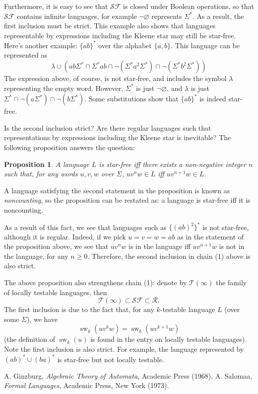 \documentclass[12pt]{article}
\newtheorem{prop}{Proposition}
\begin{document}
Furthermore, it is easy to see that $\mathscr{SF}$ is closed under Boolean operations, so that $\mathscr{SF}$ contains infinite languages, for example $\neg \varnothing$ represents $\Sigma^*$.  As a result, the first inclusion must be strict.  This example also shows that languages representable by expressions including the Kleene star may still be star-free.  Here's another example: $\lbrace ab \rbrace^*$ over the alphabet $\lbrace a,b\rbrace$.  This language can be represented as $$\lambda \cup ( ab \Sigma^* \cap \Sigma^* ab \cap \neg (\Sigma^* a^2 \Sigma^*) \cap \neg (\Sigma^* b^2 \Sigma^*))$$
The expression above, of course, is not star-free, and includes the symbol $\lambda$ representing the empty word.  However, $\Sigma^*$ is just $\neg \varnothing$, and $\lambda$ is just $\Sigma^* \cap \neg(a\Sigma^*) \cap \neg(b\Sigma^*)$.  Some substitutions show that $\lbrace ab\rbrace^*$ is indeed star-free.

Is the second inclusion strict?  Are there regular languages such that representations by expressions including the Kleene star is inevitable?  The following proposition answers the question:
\begin{prop}  A language $L$ is star-free iff there exists a non-negative integer $n$ such that, for any words $u,v,w$ over $\Sigma$, $uv^nw\in L$ iff $uv^{n+1}w\in L$.
\end{prop}
A language satisfying the second statement in the proposition is known as \emph{noncounting}, so the proposition can be restated as: a language is star-free iff it is noncounting.

As a result of this fact, we see that languages such as $\lbrace (ab)^2 \rbrace^*$ is not star-free, although it is regular.  Indeed, if we pick $u=v=w=ab$ as in the statement of the proposition above, we see that $uv^nw$ is in the language iff $uv^{n+1}w$ is not in the language, for any $n\ge 0$.  Therefore, the second inclusion in chain (1) above is also strict.

The above proposition also strengthens chain (1): denote by $\mathscr{T}(\infty)$ the family of locally testable languages, then
\begin{equation}
\mathscr{T}(\infty)\subset \mathscr{SF} \subset \mathscr{R}.
\end{equation}
The first inclusion is due to the fact that, for any $k$-testable language $L$ (over some $\Sigma$), we have $$\operatorname{sw}_k(uv^kw)=\operatorname{sw}_k(uv^{k+1}w)$$ (the definition of $\operatorname{sw}_k(u)$ is found in the entry on locally testable languages).  Note the first inclusion is also strict.  For example, the language represented by $(ab)^*\cup (ba)^*$ is star-free but not locally testable.

\begin{thebibliography}{9}
 A. Ginzburg, {\em Algebraic Theory of Automata}, Academic Press (1968).
 A. Salomaa, {\em Formal Languages}, Academic Press, New York (1973).
\end{thebibliography}
\end{document}
